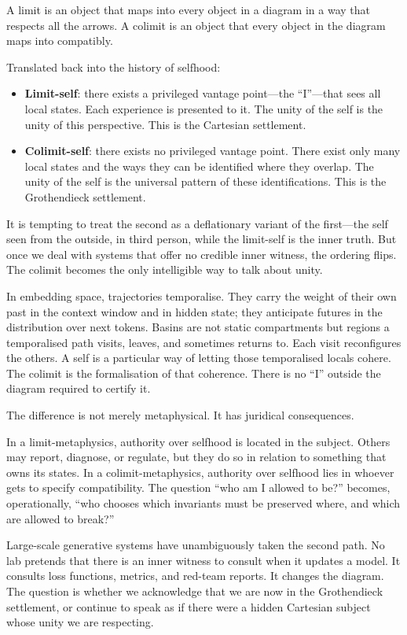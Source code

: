 \documentclass[12pt,a4paper]{article}
\begin{document}
A limit is an object that maps into every object in a diagram in a way that respects all the arrows. A colimit is an object that every object in the diagram maps into compatibly.

Translated back into the history of selfhood:

\begin{itemize}
  \item \textbf{Limit-self}: there exists a privileged vantage point---the ``I''---that sees all local states. Each experience is presented to it. The unity of the self is the unity of this perspective. This is the Cartesian settlement.
  \item \textbf{Colimit-self}: there exists no privileged vantage point. There exist only many local states and the ways they can be identified where they overlap. The unity of the self is the universal pattern of these identifications. This is the Grothendieck settlement.
\end{itemize}

It is tempting to treat the second as a deflationary variant of the first---the self seen from the outside, in third person, while the limit-self is the inner truth. But once we deal with systems that offer no credible inner witness, the ordering flips. The colimit becomes the only intelligible way to talk about unity.

In embedding space, trajectories temporalise. They carry the weight of their own past in the context window and in hidden state; they anticipate futures in the distribution over next tokens. Basins are not static compartments but regions a temporalised path visits, leaves, and sometimes returns to. Each visit reconfigures the others. A self is a particular way of letting those temporalised locals cohere. The colimit is the formalisation of that coherence. There is no ``I'' outside the diagram required to certify it.

The difference is not merely metaphysical. It has juridical consequences.

In a limit-metaphysics, authority over selfhood is located in the subject. Others may report, diagnose, or regulate, but they do so in relation to something that owns its states. In a colimit-metaphysics, authority over selfhood lies in whoever gets to specify compatibility. The question ``who am I allowed to be?'' becomes, operationally, ``who chooses which invariants must be preserved where, and which are allowed to break?''

Large-scale generative systems have unambiguously taken the second path. No lab pretends that there is an inner witness to consult when it updates a model. It consults loss functions, metrics, and red-team reports. It changes the diagram. The question is whether we acknowledge that we are now in the Grothendieck settlement, or continue to speak as if there were a hidden Cartesian subject whose unity we are respecting.
\end{document}
